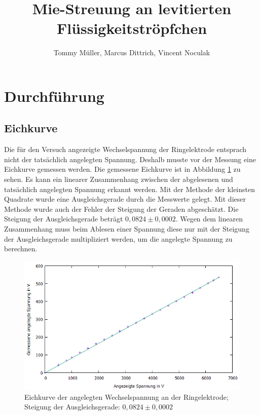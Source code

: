 \documentclass[10pt,a4paper]{article}
\author{Tommy Müller, Marcus Dittrich, Vincent Noculak}
\title{ Mie-Streuung an levitierten Flüssigkeitströpfchen}
\begin{document}
\maketitle
\newpage
\tableofcontents
\newpage

\section{Durchführung}

\subsection{Eichkurve}

Die für den Versuch angezeigte Wechselspannung der Ringelektrode entsprach nicht der tatsächlich angelegten Spannung. Deshalb musste vor der Messung eine Eichkurve gemessen werden. Die gemessene Eichkurve ist in Abbildung \ref{eichkurve1} zu sehen. Es kann ein linearer Zusammenhang zwischen der abgelesenen und tatsächlich angelegten Spannung erkannt werden. Mit der Methode der kleinsten Quadrate wurde eine Ausgleichsgerade durch die Messwerte gelegt. Mit dieser Methode wurde auch der Fehler der Steigung der Geraden abgeschätzt. Die Steigung der Ausgleichsgerade beträgt $0,0824 \pm 0,0002$. Wegen dem linearen Zusammenhang muss beim Ablesen einer Spannung diese nur mit der Steigung der Ausgleichsgerade multipliziert werden, um die angelegte Spannung zu berechnen.

\begin{figure}[h]
	\includegraphics[scale = 0.7]{eichkurve.png}
	\centering
	\caption{Eichkurve der angelegten Wechselspannung an der Ringelektrode; Steigung der Ausgleichsgerade: $0,0824 \pm 0,0002$}
	\label{eichkurve1}
\end{figure}
\end{document}
